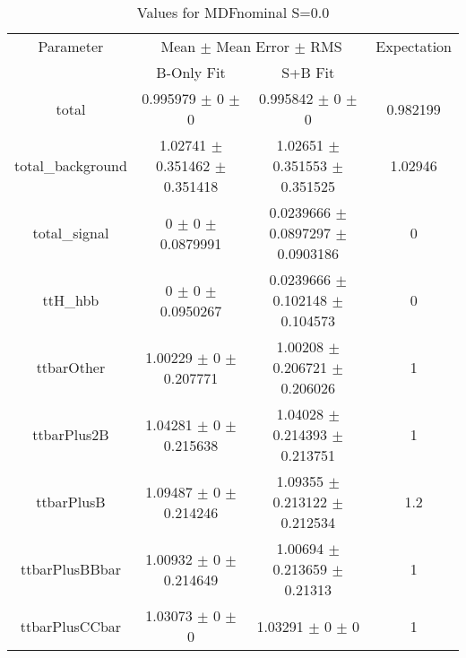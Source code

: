 \begin{table}
\centering
\caption{Values for MDFnominal S=0.0}
\begin{tabular}{cccc}
\toprule
Parameter & \multicolumn{2}{c}{Mean $\pm$ Mean Error $\pm$ RMS} & Expectation\\
 & B-Only Fit & S+B Fit & \\
\midrule
total & \num{0.995979} $\pm$ \num{0} $\pm$ \num{0} & \num{0.995842} $\pm$ \num{0} $\pm$ \num{0} & \num{0.982199}\\
total\_background & \num{1.02741} $\pm$ \num{0.351462} $\pm$ \num{0.351418} & \num{1.02651} $\pm$ \num{0.351553} $\pm$ \num{0.351525} & \num{1.02946}\\
total\_signal & \num{0} $\pm$ \num{0} $\pm$ \num{0.0879991} & \num{0.0239666} $\pm$ \num{0.0897297} $\pm$ \num{0.0903186} & \num{0}\\
ttH\_hbb & \num{0} $\pm$ \num{0} $\pm$ \num{0.0950267} & \num{0.0239666} $\pm$ \num{0.102148} $\pm$ \num{0.104573} & \num{0}\\
ttbarOther & \num{1.00229} $\pm$ \num{0} $\pm$ \num{0.207771} & \num{1.00208} $\pm$ \num{0.206721} $\pm$ \num{0.206026} & \num{1}\\
ttbarPlus2B & \num{1.04281} $\pm$ \num{0} $\pm$ \num{0.215638} & \num{1.04028} $\pm$ \num{0.214393} $\pm$ \num{0.213751} & \num{1}\\
ttbarPlusB & \num{1.09487} $\pm$ \num{0} $\pm$ \num{0.214246} & \num{1.09355} $\pm$ \num{0.213122} $\pm$ \num{0.212534} & \num{1.2}\\
ttbarPlusBBbar & \num{1.00932} $\pm$ \num{0} $\pm$ \num{0.214649} & \num{1.00694} $\pm$ \num{0.213659} $\pm$ \num{0.21313} & \num{1}\\
ttbarPlusCCbar & \num{1.03073} $\pm$ \num{0} $\pm$ \num{0} & \num{1.03291} $\pm$ \num{0} $\pm$ \num{0} & \num{1}\\
\bottomrule
\end{tabular}
\end{table}